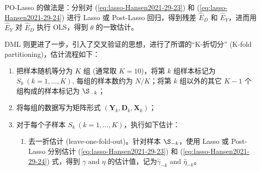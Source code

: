 {PO-Lasso 的做法是：分别对 (\ref{eq:lasso-Hansen2021-29-23}) 和 (\ref{eq:lasso-Hansen2021-29-24}) 进行 Lasso 或 Post-Lasso 回归，得到残差 $\widehat{E}_D$ 和 $\widehat{E}_Y$，进而用 $\widehat{E}_Y$ 对 $\widehat{E}_D$ 执行 OLS，得到 $\theta$ 的一致估计。

DML 则更进了一步，引入了交叉验证的思想，进行了所谓的“K-折切分” (K-fold partitioning)，估计流程如下：
    
    
    \begin{center}
    \end{center}
\begin{enumerate}
\item  把样本随机等分为 $K$ 组 (通常取 $K=10$)，将第 $k$ 组样本标记为 $S_{k}\ (k=1, \ldots, K)$, 每组的样本数约为 $N / K$；将第 $k$ 组以外的其它 $K-1$ 个组构成的样本标记为 $\S_{-k}$；
\item 将每组的数据写为矩阵形式 $\left(\boldsymbol{Y}_{k}, \boldsymbol{D}_{k}, \boldsymbol{X}_{k}\right)$；
\item 对于每个子样本 $S_{k}\ (k=1, \ldots, K)$，执行如下估计：
   \begin{enumerate}
   \item 去一折估计 (leave-one-fold-out)。针对样本 $\S_{-k}$，使用 Lasso 或 Post-Lasso 分别估计 (\ref{eq:lasso-Hansen2021-29-23}) 和 (\ref{eq:lasso-Hansen2021-29-24}) 式，得到 $\gamma$ and $\eta$ 的估计值，记为$\hat{\gamma}_{-k}$ and $\widehat{\eta}_{-k}$。 

\end{enumerate}
\end{enumerate}}
